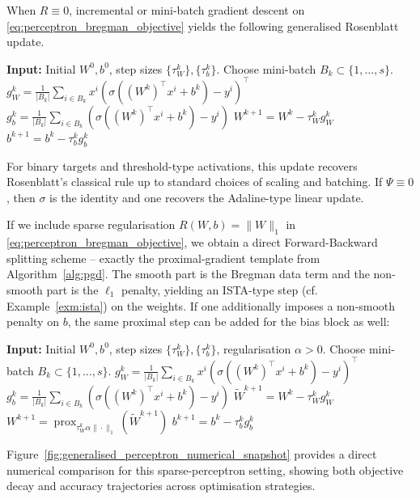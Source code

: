 When $R \equiv 0$, incremental or mini-batch gradient descent on \eqref{eq:perceptron_bregman_objective} yields the following generalised Rosenblatt update.
\begin{algorithm}
\caption{Generalised Rosenblatt Update (Bregman Loss)}\label{alg:generalised_rosenblatt}
\begin{algorithmic}
\State \textbf{Input:} Initial $W^0, b^0$, step sizes $\{\tau_W^k\}, \{\tau_b^k\}$.
\State Choose mini-batch $B_k \subset \{1,\ldots,s\}$.
\State $g_W^k = \frac{1}{|B_k|}\sum_{i\in B_k} x^i\left(\sigma\!\left((W^k)^\top x^i + b^k\right) - y^i\right)^\top$
\State $g_b^k = \frac{1}{|B_k|}\sum_{i\in B_k} \left(\sigma\!\left((W^k)^\top x^i + b^k\right) - y^i\right)$
\State $W^{k+1} = W^k - \tau_W^k g_W^k$
\State $b^{k+1} = b^k - \tau_b^k g_b^k$
\EndFor
\end{algorithmic}
\end{algorithm}
For binary targets and threshold-type activations, this update recovers Rosenblatt's classical rule up to standard choices of scaling and batching. If $\Psi \equiv 0$, then $\sigma$ is the identity and one recovers the Adaline-type linear update.

If we include sparse regularisation $R(W,b)=\|W\|_1$ in \eqref{eq:perceptron_bregman_objective}, we obtain a direct Forward-Backward splitting scheme -- exactly the proximal-gradient template from Algorithm~\ref{alg:pgd}. The smooth part is the Bregman data term and the non-smooth part is the $\ell_1$ penalty, yielding an ISTA-type step (cf. Example~\ref{exm:ista}) on the weights. If one additionally imposes a non-smooth penalty on $b$, the same proximal step can be added for the bias block as well:
\begin{algorithm}
\caption{Rosenblatt-ISTA for Sparse Perceptrons}\label{alg:rosenblatt_ista_ch9}
\begin{algorithmic}
\State \textbf{Input:} Initial $W^0, b^0$, step sizes $\{\tau_W^k\}, \{\tau_b^k\}$, regularisation $\alpha>0$.
\State Choose mini-batch $B_k \subset \{1,\ldots,s\}$.
\State $g_W^k = \frac{1}{|B_k|}\sum_{i\in B_k} x^i\left(\sigma\!\left((W^k)^\top x^i + b^k\right) - y^i\right)^\top$
\State $g_b^k = \frac{1}{|B_k|}\sum_{i\in B_k} \left(\sigma\!\left((W^k)^\top x^i + b^k\right) - y^i\right)$
\State $\widetilde W^{k+1} = W^k - \tau_W^k g_W^k$
\State $W^{k+1} = \operatorname{prox}_{\tau_W^k\alpha\|\cdot\|_1}(\widetilde W^{k+1})$
\State $b^{k+1} = b^k - \tau_b^k g_b^k$
\EndFor
\end{algorithmic}
\end{algorithm}
Figure~\ref{fig:generalised_perceptron_numerical_snapshot} provides a direct numerical comparison for this sparse-perceptron setting, showing both objective decay and accuracy trajectories across optimisation strategies.

